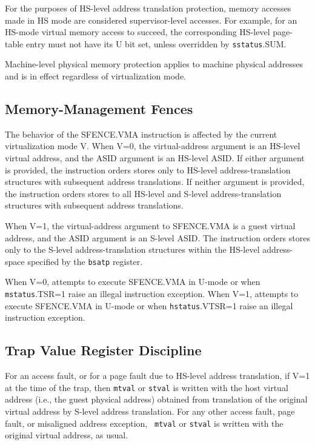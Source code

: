 For the purposes of HS-level address translation protection, memory accesses
made in HS mode are considered supervisor-level accesses.  For example, for an
HS-mode virtual memory access to succeed, the corresponding HS-level page-table
entry must not have its U bit set, unless overridden by {\tt sstatus}.SUM.

Machine-level physical memory protection applies to machine physical
addresses and is in effect regardless of virtualization mode.

\subsection{Memory-Management Fences}

The behavior of the SFENCE.VMA instruction is affected by the current
virtualization mode V.  When V=0, the virtual-address argument is an HS-level
virtual address, and the ASID argument is an HS-level ASID.  If either argument
is provided, the instruction orders stores only to HS-level address-translation
structures with subsequent address translations.  If neither argument is
provided, the instruction orders stores to all HS-level and S-level address-translation structures
with subsequent address translations.

When V=1, the virtual-address argument to SFENCE.VMA is a guest virtual
address, and the ASID argument is an S-level ASID.  The instruction
orders stores only to the S-level address-translation structures within the
HS-level address-space specified by the {\tt bsatp} register.

When V=0, attempts to execute SFENCE.VMA in U-mode or when {\tt mstatus}.TSR=1
raise an illegal instruction exception.  When V=1, attempts to execute
SFENCE.VMA in U-mode or when {\tt hstatus}.VTSR=1 raise an illegal instruction
exception.

\subsection{Trap Value Register Discipline}

For an access fault, or for a page fault due to HS-level address translation,
if V=1 at the time of the trap, then {\tt mtval} or {\tt stval} is written
with the host virtual address (i.e., the guest physical address) obtained from
translation of the original virtual address by S-level address translation.
For any other access fault, page fault, or misaligned address exception, {\tt
mtval} or {\tt stval} is written with the original virtual address, as usual.

